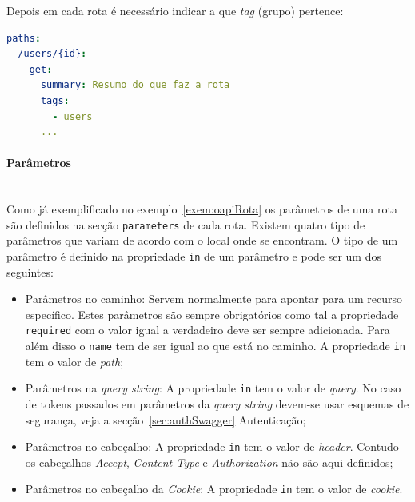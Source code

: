 Depois em cada rota é necessário indicar a que \textit{tag} (grupo) pertence:
\begin{lstlisting}[language=yaml, caption=Exemplo de uso de \textit{tags} numa rota na especificação \textit{OpenAPI}]
paths:
  /users/{id}:
    get:
      summary: Resumo do que faz a rota
      tags:
        - users
      ...
\end{lstlisting}

\vspace{-0.7cm}

\paragraph{Parâmetros}\label{sec:paramSwagger} \mbox{} \\
Como já exemplificado no exemplo~\ref{exem:oapiRota} os parâmetros de uma rota são definidos na 
secção \texttt{parameters} de cada rota. 
Existem quatro tipo de parâmetros que variam de acordo com o local onde se encontram. 
O tipo de um parâmetro é definido na propriedade \texttt{in} de um parâmetro e pode ser um dos seguintes:
\begin{itemize}
    \item Parâmetros no caminho: Servem normalmente para apontar para um recurso específico. 
    Estes parâmetros são sempre obrigatórios como tal a propriedade \texttt{required} com o valor igual a 
    verdadeiro deve ser sempre adicionada. Para além disso o \texttt{name} tem de ser igual ao que está no 
    caminho. A propriedade \texttt{in} tem o valor de \textit{path};
    \item Parâmetros na \textit{query string}: A propriedade \texttt{in} tem o valor de \textit{query}. 
    No caso de tokens passados em parâmetros da \textit{query string} devem-se usar esquemas de segurança, 
    veja a secção~\ref{sec:authSwagger} Autenticação;
    \item Parâmetros no cabeçalho: A propriedade \texttt{in} tem o valor de \textit{header}. 
    Contudo os cabeçalhos \textit{Accept}, \textit{Content-Type} e \textit{Authorization} não são aqui definidos;
    \item Parâmetros no cabeçalho da \textit{Cookie}: A propriedade \texttt{in} tem o valor de \textit{cookie}.
\end{itemize}

